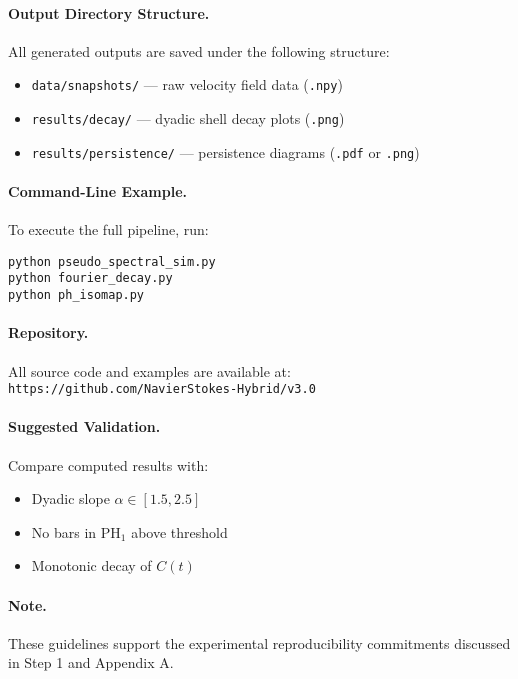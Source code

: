 \documentclass[11pt]{article}
\theoremstyle{definition}
\begin{document}
\paragraph{Output Directory Structure.}
All generated outputs are saved under the following structure:
\begin{itemize}
  \item \texttt{data/snapshots/} — raw velocity field data (\texttt{.npy})
  \item \texttt{results/decay/} — dyadic shell decay plots (\texttt{.png})
  \item \texttt{results/persistence/} — persistence diagrams (\texttt{.pdf} or \texttt{.png})
\end{itemize}

\paragraph{Command-Line Example.}
To execute the full pipeline, run:
\begin{verbatim}
python pseudo_spectral_sim.py
python fourier_decay.py
python ph_isomap.py
\end{verbatim}

\paragraph{Repository.}
All source code and examples are available at: \texttt{https://github.com/NavierStokes-Hybrid/v3.0}

\paragraph{Suggested Validation.}
Compare computed results with:
\begin{itemize}
  \item Dyadic slope \( \alpha \in [1.5, 2.5] \)
  \item No bars in \( \mathrm{PH}_1 \) above threshold
  \item Monotonic decay of \( C(t) \)
\end{itemize}

\paragraph{Note.} These guidelines support the experimental reproducibility commitments discussed in Step 1 and Appendix A.

\end{document}
